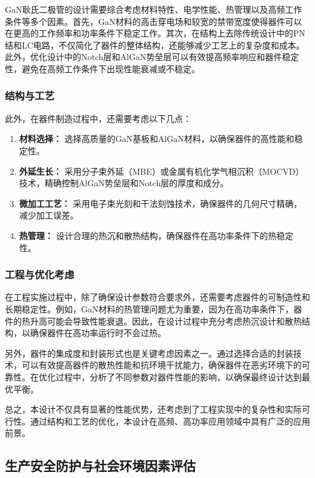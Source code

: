 \documentclass[12pt,hyperref,a4paper,UTF8]{ctexart}
\begin{document}
GaN耿氏二极管的设计需要综合考虑材料特性、电学性能、热管理以及高频工作条件等多个因素。首先，GaN材料的高击穿电场和较宽的禁带宽度使得器件可以在更高的工作频率和功率条件下稳定工作。其次，在结构上去除传统设计中的PN结和LC电路，不仅简化了器件的整体结构，还能够减少工艺上的复杂度和成本。此外，优化设计中的Notch层和AlGaN势垒层可以有效提高频率响应和器件稳定性，避免在高频工作条件下出现性能衰减或不稳定。

\subsubsection*{结构与工艺}

此外，在器件制造过程中，还需要考虑以下几点：
\begin{enumerate}
    \item \textbf{材料选择：} 选择高质量的GaN基板和AlGaN材料，以确保器件的高性能和稳定性。
    \item \textbf{外延生长：} 采用分子束外延（MBE）或金属有机化学气相沉积（MOCVD）技术，精确控制AlGaN势垒层和Notch层的厚度和成分。
    \item \textbf{微加工工艺：} 采用电子束光刻和干法刻蚀技术，确保器件的几何尺寸精确，减少加工误差。
    \item \textbf{热管理：} 设计合理的热沉和散热结构，确保器件在高功率条件下的热稳定性。
\end{enumerate}


\subsubsection*{工程与优化考虑}

在工程实施过程中，除了确保设计参数符合要求外，还需要考虑器件的可制造性和长期稳定性。例如，GaN材料的热管理问题尤为重要，因为在高功率条件下，器件的热升高可能会导致性能衰退。因此，在设计过程中充分考虑热沉设计和散热结构，以确保器件在高功率运行时不会过热。

另外，器件的集成度和封装形式也是关键考虑因素之一。通过选择合适的封装技术，可以有效提高器件的散热性能和抗环境干扰能力，确保器件在恶劣环境下的可靠性。在优化过程中，分析了不同参数对器件性能的影响，以确保最终设计达到最优平衡。

总之，本设计不仅具有显著的性能优势，还考虑到了工程实现中的复杂性和实际可行性。通过结构和工艺的优化，本设计在高频、高功率应用领域中具有广泛的应用前景。

\subsection{生产安全防护与社会环境因素评估}
\end{document}
